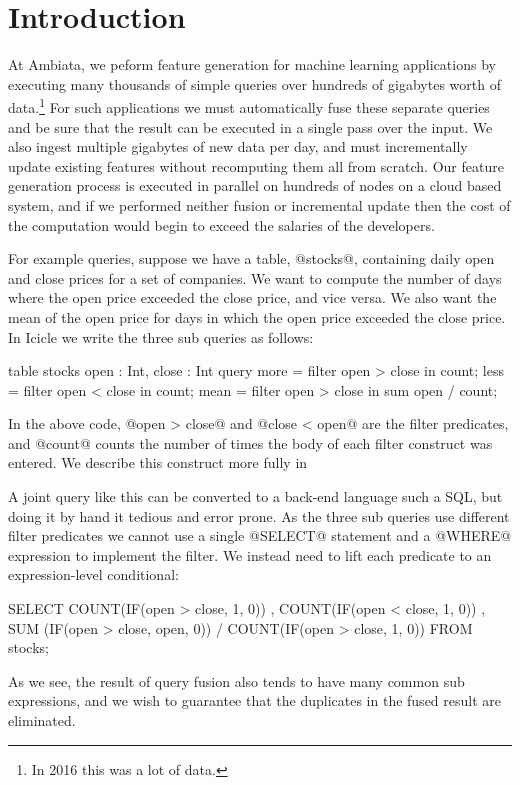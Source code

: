 \section{Introduction}
\label{s:Introduction}

At Ambiata, we peform feature generation for machine learning applications by executing many thousands of simple queries over hundreds of gigabytes worth of data.\footnote{In 2016 this was a lot of data.} For such applications we must automatically fuse these separate queries and be sure that the result can be executed in a single pass over the input. We also ingest multiple gigabytes of new data per day, and must incrementally update existing features without recomputing them all from scratch. Our feature generation process is executed in parallel on hundreds of nodes on a cloud based system, and if we performed neither fusion or incremental update then the cost of the computation would begin to exceed the salaries of the developers.

For example queries, suppose we have a table, @stocks@, containing daily open and close prices for a set of companies. We want to compute the number of days where the open price exceeded the close price, and vice versa. We also want the mean of the open price for days in which the open price exceeded the close price. In Icicle we write the three sub queries as follows:

\begin{code}
table stocks { open : Int, close : Int }
query 
  more  = filter open > close in count;
  less  = filter open < close in count;
  mean  = filter open > close in sum open / count;
\end{code}
In the above code, @open > close@ and @close < open@ are the filter predicates, and @count@ counts the number of times the body of each filter construct was entered. We describe this construct more fully in \REF

A joint query like this can be converted to a back-end language such a SQL, but doing it by hand it tedious and error prone. As the three sub queries use different filter predicates we cannot use a single @SELECT@ statement and a @WHERE@ expression to implement the filter. We instead need to lift each predicate to an expression-level conditional:
\begin{code}
  SELECT COUNT(IF(open > close, 1, 0))
       , COUNT(IF(open < close, 1, 0))
       , SUM  (IF(open > close, open, 0))
       / COUNT(IF(open > close, 1, 0))
  FROM stocks;
\end{code}
As we see, the result of query fusion also tends to have many common sub expressions, and we wish to guarantee that the duplicates in the fused result are eliminated.

